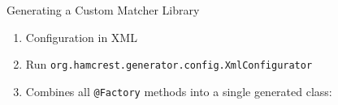 \begin{frame}[fragile]{Generating a Custom Matcher Library}
	\begin{enumerate}
		\item Configuration in XML
			
		\item Run \texttt{org.hamcrest.generator.config.XmlConfigurator}
		\item Combines all \texttt{@Factory} methods into a single generated class:
	\end{enumerate}
\end{frame}

